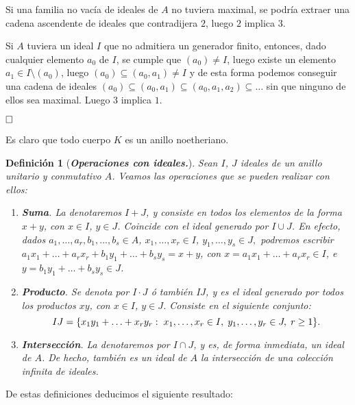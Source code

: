 \documentclass[12pt]{article}
\newtheorem{definition}[theorem]{Definición}
\begin{document}
Si una familia no vacía de ideales de $A$ no tuviera maximal, se podría extraer una cadena ascendente de ideales que contradijera $2$, luego $2$ implica $3$.

Si $A$ tuviera un ideal $I$ que no admitiera un generador finito, entonces, dado cualquier elemento $a_0$ de $I$, se cumple que $(a_0) \neq I$, luego existe un elemento $a_1 \in I \setminus (a_0)$, luego $(a_0) \subseteq (a_0,a_1) \neq I$ y de esta forma podemos conseguir una cadena de ideales $(a_0) \subseteq (a_0,a_1) \subseteq (a_0,a_1,a_2) \subseteq \ldots$ sin que ninguno de ellos sea maximal. Luego $3$ implica $1.$

$\hfill \square$

Es claro que todo cuerpo $K$ es un anillo noetheriano.

\begin{definition}[\textbf{\textit{Operaciones con ideales.}}] Sean $I$, $J$ ideales de un anillo unitario y conmutativo $A$. Veamos las operaciones que se pueden realizar con ellos:\begin{enumerate}
\item \textbf{Suma}. La denotaremos $I + J$, y consiste en todos los elementos de la forma $x+ y$, con $x \in I$, $y \in J$. Coincide con el ideal generado por $I \cup J$. En efecto, dados $a_{1}, \ldots, a_{r}, b_{1}, \ldots, b_{s} \in A$, $x_{1}, \ldots, x_{r} \in I$, $y_{1}, \ldots, y_{s} \in J,$ podremos escribir $a_{1}x_{1} + \ldots + a_{r}x_{r} + b_{1}y_{1} + \ldots + b_{s}y_{s} = x + y$, con $x = a_{1}x_{1} + \ldots + a_{r}x_{r} \in I$, e $y= b_{1}y_{1} + \ldots + b_{s}y_{s} \in J$.
\item \textbf{Producto}. Se denota por $I \cdot J$ ó también $IJ$, y es el ideal generado por todos los productos $xy$, con $x \in I$, $y \in J$. Consiste en el siguiente conjunto: $$IJ = \lbrace x_{1}y_{1} + \ldots + x_{r}y_{r} : \hspace{0.1cm} x_{1}, \ldots, x_{r} \in I, \hspace{0.1cm} y_{1}, \ldots, y_{r} \in J, \hspace{0.1cm} r \geq 1 \rbrace.$$
\item \textbf{Intersección}. La denotaremos por $I \cap J$, y es, de forma inmediata, un ideal de $A$. De hecho, también es un ideal de $A$ la intersección de una colección infinita de ideales.
\end{enumerate}
\end{definition}

De estas definiciones deducimos el siguiente resultado:
\end{document}

